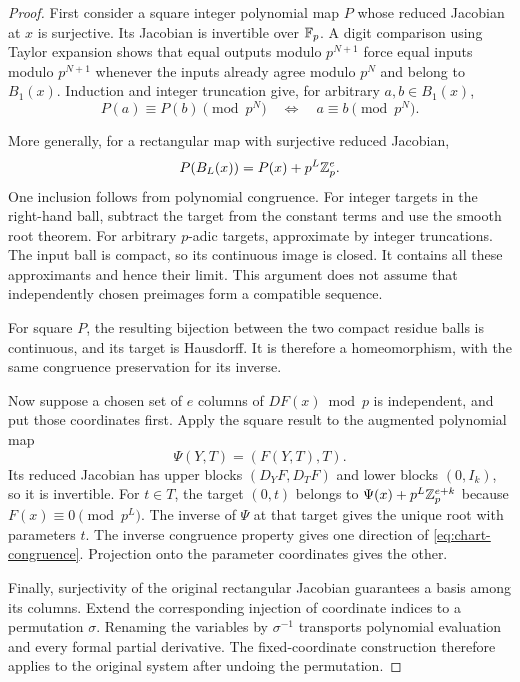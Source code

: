 \begin{proof}
First consider a square integer polynomial map $P$ whose reduced Jacobian
at $x$ is surjective. Its Jacobian is invertible over $\mathbb F_p$. A digit
comparison using Taylor expansion shows that equal outputs modulo
$p^{N+1}$ force equal inputs modulo $p^{N+1}$ whenever the inputs already
agree modulo $p^N$ and belong to $B_1(x)$. Induction and integer truncation
give, for arbitrary $a,b\in B_1(x)$,
\[
 P(a)\equiv P(b)\pmod{p^N}
 \quad\Longleftrightarrow\quad a\equiv b\pmod{p^N}.
\]

More generally, for a rectangular map with surjective reduced Jacobian,
\begin{equation}\label{eq:polynomial-ball-image}
 P(B_L(x))=P(x)+p^L\mathbb Z_p^e.
\end{equation}
One inclusion follows from polynomial congruence. For integer targets in
the right-hand ball, subtract the target from the constant terms and use
the smooth root theorem. For arbitrary $p$-adic targets, approximate by
integer truncations. The input ball is compact, so its continuous image is
closed. It contains all these approximants and hence their limit. This
argument does not assume that independently chosen preimages form a
compatible sequence.

For square $P$, the resulting bijection between the two compact residue
balls is continuous, and its target is Hausdorff. It is therefore a
homeomorphism, with the same congruence preservation for its inverse.

Now suppose a chosen set of $e$ columns of $DF(x)\bmod p$ is independent,
and put those coordinates first. Apply the square result to the augmented
polynomial map
\[
 \Psi(Y,T)=(F(Y,T),T).
\]
Its reduced Jacobian has upper blocks $(D_YF,D_TF)$ and lower blocks
$(0,I_k)$, so it is invertible. For $t\in T$, the target $(0,t)$ belongs
to $\Psi(x)+p^L\mathbb Z_p^{e+k}$ because $F(x)\equiv0\pmod{p^L}$.
The inverse of $\Psi$ at that target gives the unique root with parameters
$t$. The inverse congruence property gives one direction of
\eqref{eq:chart-congruence}. Projection onto the parameter coordinates
gives the other.

Finally, surjectivity of the original rectangular Jacobian guarantees a
basis among its columns. Extend the corresponding injection of coordinate
indices to a permutation $\sigma$. Renaming the variables by
$\sigma^{-1}$ transports polynomial evaluation and every formal partial
derivative. The fixed-coordinate construction therefore applies to the
original system after undoing the permutation.
\end{proof}

